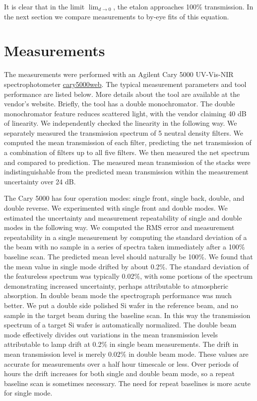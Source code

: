 \documentclass[osajnl,preprint,showpacs,superscriptaddress,12pt]{revtex4-1} %
\begin{document}
It is clear that in the limit $\lim_{d \rightarrow 0}$, the etalon approaches 100\% transmission.  In the next section we compare measurements to by-eye fits of this equation.

\section{Measurements}
The measurements were performed with an Agilent Cary 5000 UV-Vis-NIR spectrophotometer \url{cary5000web}.  The typical measurement parameters and tool performance are listed below.  More details about the tool are available at the vendor's website.  Briefly, the tool has a double monochromator.  The double monochromator feature reduces scattered light, with the vendor claiming 40 dB of linearity.  We independently checked the linearity in the following way.  We separately measured the transmission spectrum of 5 neutral density filters.  We computed the mean transmission of each filter, predicting the net transmission of a combination of filters up to all five filters.  We then measured the net spectrum and compared to prediction.  The measured mean transmission of the stacks were indistinguishable from the predicted mean transmission within the measurement uncertainty over 24 dB.  

The Cary 5000 has four operation modes: single front, single back, double, and double reverse.  We experimented with single front and double modes.  We estimated the uncertainty and measurement repeatability of single and double modes in the following way.  We computed the RMS error and measurement repeatability in a single measurement by computing the standard deviation of a the beam with no sample in a series of spectra taken immediately after a 100\% baseline scan.  The predicted mean level should naturally be 100\%.  We found that the mean value in single mode drifted by about 0.2\%.  The standard deviation of the featureless spectrum was typically 0.02\%, with some portions of the spectrum demonstrating increased uncertainty, perhaps attributable to atmospheric absorption. In double beam mode the spectrograph performance was much better.  We put a double side polished Si wafer in the reference beam, and no sample in the target beam during the baseline scan.  In this way the transmission spectrum of a target Si wafer is automatically normalized.  The double beam mode effectively divides out variations in the mean transmission levels attributable to lamp drift at 0.2\% in single beam measurements.  The drift in mean transmission level is merely 0.02\% in double beam mode.  These values are accurate for measurements over a half hour timescale or less.  Over periods of hours the drift increases for both single and double beam mode, so a repeat baseline scan is sometimes necessary.  The need for repeat baselines is more acute for single mode.
\end{document}
